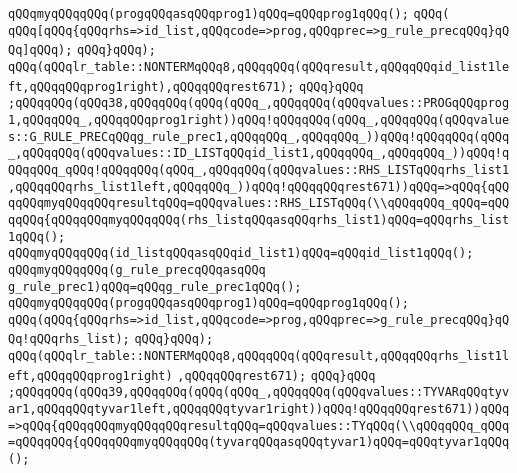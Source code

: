 \verb|qQQqmyqQQqqQQq(progqQQqasqQQqprog1)qQQq=qQQqprog1qQQq();|\newline
\verb|qQQq(|\newline
\verb|qQQq[qQQq{qQQqrhs=>id_list,qQQqcode=>prog,qQQqprec=>g_rule_precqQQq}qQQq]qQQq);|\newline
\verb|qQQq}qQQq);|\newline
\verb|qQQq(qQQqlr_table::NONTERMqQQq8,qQQqqQQq(qQQqresult,qQQqqQQqid_list1left,qQQqqQQqprog1right),qQQqqQQqrest671);|\newline
\verb|qQQq}qQQq|\newline
\verb|;qQQqqQQq(qQQq38,qQQqqQQq(qQQq(qQQq_,qQQqqQQq(qQQqvalues::PROGqQQqprog1,qQQqqQQq_,qQQqqQQqprog1right))qQQq!qQQqqQQq(qQQq_,qQQqqQQq(qQQqvalues::G_RULE_PRECqQQqg_rule_prec1,qQQqqQQq_,qQQqqQQq_))qQQq!qQQqqQQq(qQQq_,qQQqqQQq(qQQqvalues::ID_LISTqQQqid_list1,qQQqqQQq_,qQQqqQQq_))qQQq!qQQqqQQq_qQQq!qQQqqQQq(qQQq_,qQQqqQQq(qQQqvalues::RHS_LISTqQQqrhs_list1|\newline
\verb|,qQQqqQQqrhs_list1left,qQQqqQQq_))qQQq!qQQqqQQqrest671))qQQq=>qQQq{qQQqqQQqmyqQQqqQQqresultqQQq=qQQqvalues::RHS_LISTqQQq(\\qQQqqQQq_qQQq=qQQqqQQq{qQQqqQQqmyqQQqqQQq(rhs_listqQQqasqQQqrhs_list1)qQQq=qQQqrhs_list1qQQq();|\newline
\verb|qQQqmyqQQqqQQq(id_listqQQqasqQQqid_list1)qQQq=qQQqid_list1qQQq();|\newline
\verb|qQQqmyqQQqqQQq(g_rule_precqQQqasqQQq|\newline
\verb|g_rule_prec1)qQQq=qQQqg_rule_prec1qQQq();|\newline
\verb|qQQqmyqQQqqQQq(progqQQqasqQQqprog1)qQQq=qQQqprog1qQQq();|\newline
\verb|qQQq(qQQq{qQQqrhs=>id_list,qQQqcode=>prog,qQQqprec=>g_rule_precqQQq}qQQq!qQQqrhs_list);|\newline
\verb|qQQq}qQQq);|\newline
\verb|qQQq(qQQqlr_table::NONTERMqQQq8,qQQqqQQq(qQQqresult,qQQqqQQqrhs_list1left,qQQqqQQqprog1right)|\newline
\verb|,qQQqqQQqrest671);|\newline
\verb|qQQq}qQQq|\newline
\verb|;qQQqqQQq(qQQq39,qQQqqQQq(qQQq(qQQq_,qQQqqQQq(qQQqvalues::TYVARqQQqtyvar1,qQQqqQQqtyvar1left,qQQqqQQqtyvar1right))qQQq!qQQqqQQqrest671))qQQq=>qQQq{qQQqqQQqmyqQQqqQQqresultqQQq=qQQqvalues::TYqQQq(\\qQQqqQQq_qQQq=qQQqqQQq{qQQqqQQqmyqQQqqQQq(tyvarqQQqasqQQqtyvar1)qQQq=qQQqtyvar1qQQq();|\newline
